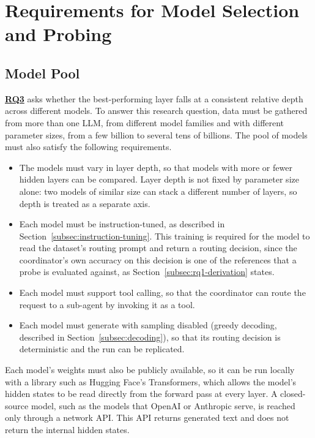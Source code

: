 \section{Requirements for Model Selection and Probing}
\label{sec:model-selection-requirements}

\subsection{Model Pool}
\label{subsec:model-pool-requirements}

\hyperref[rq:rq3]{\textbf{RQ3}} asks whether the best-performing layer falls at a consistent relative depth across different models. To answer this research question, data must be gathered from more than one LLM, from different model families and with different parameter sizes, from a few billion to several tens of billions. The pool of models must also satisfy the following requirements.

\begin{itemize}
    \item The models must vary in layer depth, so that models with more or fewer hidden layers can be compared. Layer depth is not fixed by parameter size alone: two models of similar size can stack a different number of layers, so depth is treated as a separate axis.
    \item Each model must be instruction-tuned, as described in Section~\ref{subsec:instruction-tuning}. This training is required for the model to read the dataset's routing prompt and return a routing decision, since the coordinator's own accuracy on this decision is one of the references that a probe is evaluated against, as Section~\ref{subsec:rq1-derivation} states.
    \item Each model must support tool calling, so that the coordinator can route the request to a sub-agent by invoking it as a tool.
    \item Each model must generate with sampling disabled (greedy decoding, described in Section~\ref{subsec:decoding}), so that its routing decision is deterministic and the run can be replicated.
\end{itemize}

Each model's weights must also be publicly available, so it can be run locally with a library such as Hugging Face's Transformers, which allows the model's hidden states to be read directly from the forward pass at every layer. A closed-source model, such as the models that OpenAI or Anthropic serve, is reached only through a network API. This API returns generated text and does not return the internal hidden states.

